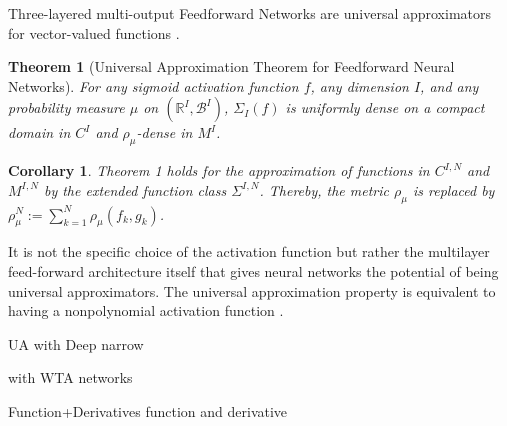 \documentclass{article}
\newtheorem{theorem}{Theorem}
\newtheorem{corollary}{Corollary}[theorem]
\theoremstyle{definition}
\theoremstyle{remark}
\newcounter{ct}
\begin{document}
Three-layered multi-output Feedforward Networks are universal approximators for vector-valued functions \citep{irie1988capabilities}.

\begin{theorem}[Universal Approximation Theorem for Feedforward Neural Networks\citep{hornik1989multilayer,schafer2007uap}]
For any sigmoid activation function \( f \), any dimension \( I \), and any probability measure \( \mu \) on \( (\mathbb{R}^I, \mathcal{B}^I) \), \( \Sigma_I(f) \) is uniformly dense on a compact domain in \( C^I \) and \( \rho_{\mu} \)-dense in \( M^I \).
\end{theorem}

\begin{corollary}%
Theorem 1 holds for the approximation of functions in \( C^{I,N} \) and \( M^{I,N} \) by the extended function class \( \Sigma^{I,N} \). Thereby, the metric \( \rho_{\mu} \) is replaced by \( \rho_{\mu}^N := \sum_{k=1}^{N} \rho_{\mu}(f_k, g_k) \).
\end{corollary}



It is not the specific choice of the activation function but rather the multilayer feed-forward architecture itself that gives neural networks the potential of being universal approximators\citep{hornik1991approximation}.
%
The universal approximation property is equivalent to having a nonpolynomial activation function \citep{pinkus1999approximation}.

\citep{mhaskar1997neural}
\citep{leshno1993multilayer}

UA with Deep narrow \citep{kidger2020universal}

with WTA networks \citep{maass2000wta}

Function+Derivatives \citep{hornik1990universal}
function and derivative \citep{li1996simultaneous}
\end{document}
